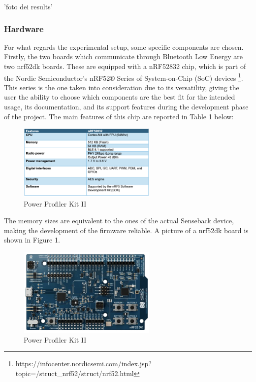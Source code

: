 \documentclass{Configuration_Files/PoliMi3i_thesis}
\begin{document}
'foto dei results'




\subsubsection*{Hardware}

For what regards the experimental setup, some specific components are chosen. Firstly, the two boards which communicate through Bluetooth Low Energy are two nrf52dk boards. These are equipped with a nRF52832 chip, which is part of the Nordic Semiconductor’s nRF52® Series of System-on-Chip (SoC) devices \footnote{https://infocenter.nordicsemi.com/index.jsp?topic=/struct\_nrf52/struct/nrf52.html}. This series is the one taken into consideration due to its versatility, giving the user the ability to choose which components are the best fit for the intended usage, its documentation, and its support features during the development phase of the project. The main features of this chip are reported in Table 1 below:

\begin{figure}[H]
    \centering
    \includegraphics[width=0.6\textwidth]{Materials/figure1}
    \caption{Power Profiler Kit II}
\end{figure}

The memory sizes are equivalent to the ones of the actual Senseback device, making the development of the firmware reliable. A picture of a nrf52dk board is shown in Figure 1.

\begin{figure}[H]
    \centering
    \includegraphics[width=0.6\textwidth]{Materials/figure2}
    \caption{Power Profiler Kit II}
\end{figure}
\end{document}
